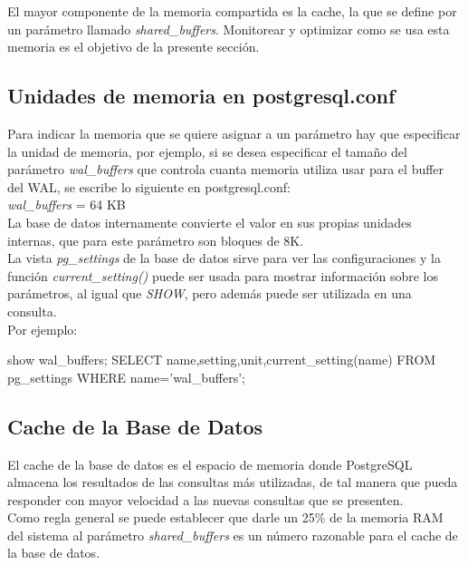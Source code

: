 El mayor componente de la memoria compartida es la cache, la que se define por un parámetro llamado \textit{shared\_buffers}. Monitorear y optimizar como se usa esta memoria es el objetivo de la presente sección.

\subsection{Unidades de memoria en postgresql.conf} 

Para indicar la memoria que se quiere asignar a un parámetro hay que especificar la unidad de memoria, por ejemplo, si se desea especificar el tamaño del parámetro \textit{wal\_buffers} que controla cuanta memoria utiliza usar para el buffer del WAL, se escribe lo siguiente en postgresql.conf:\\

\textit{wal\_buffers} = 64 KB\\

La base de datos internamente convierte el valor en sus propias unidades internas, que para este parámetro son bloques de 8K.\\

La vista \textit{pg\_settings} de la base de datos sirve para ver las configuraciones y la función \textit{current\_setting()} puede ser usada para mostrar información sobre los parámetros, al igual que \textit{SHOW}, pero además puede ser utilizada en una consulta.\\

Por ejemplo:\\

\begin{pyglist}
show wal_buffers;
SELECT name,setting,unit,current_setting(name) FROM pg_settings 
WHERE name='wal_buffers';
\end{pyglist}

\subsection{Cache de la Base de Datos}

El cache de la base de datos es el espacio de memoria donde PostgreSQL almacena los resultados de las consultas más utilizadas, de tal manera que pueda responder con mayor velocidad a las nuevas consultas que se presenten.\\

Como regla general se puede establecer que darle un 25\% de la memoria RAM del sistema al parámetro \textit{shared\_buffers} es un número razonable para el cache de la base de datos.\\

